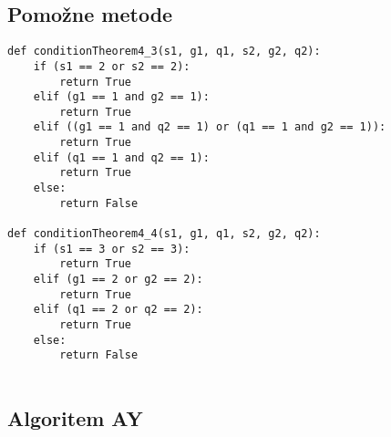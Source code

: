 \documentclass[12pt,a4paper,twoside]{article}
\theoremstyle{definition} %
\theoremstyle{plain} %
\numberwithin{equation}{section}  %
\begin{document}
\subsection*{Pomožne metode}
\begin{verbatim}
def conditionTheorem4_3(s1, g1, q1, s2, g2, q2):
    if (s1 == 2 or s2 == 2):
        return True
    elif (g1 == 1 and g2 == 1):
        return True
    elif ((g1 == 1 and q2 == 1) or (q1 == 1 and g2 == 1)):
        return True
    elif (q1 == 1 and q2 == 1):
        return True
    else:
        return False
    
def conditionTheorem4_4(s1, g1, q1, s2, g2, q2):
    if (s1 == 3 or s2 == 3):
        return True
    elif (g1 == 2 or g2 == 2):
        return True
    elif (q1 == 2 or q2 == 2):
        return True
    else:
        return False
   
\end{verbatim}


\subsection*{Algoritem AY}
\end{document}
